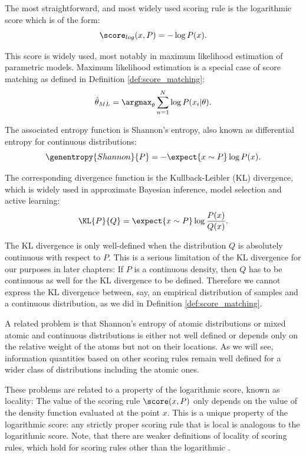 The most straightforward, and most widely used scoring rule is the logarithmic score which is of the form:
%
\begin{equation}
	\score_{log}(x,P) = - \log P(x).
\end{equation}

This score is widely used, most notably in maximum likelihood estimation of parametric models. Maximum likelihood estimation is a special case of score matching as defined in Definition \ref{def:score_matching}:
%
\begin{equation}
	\hat{\theta}_{ML} = \argmax_{\theta} \sum_{n=1}^{N} \log P(x_i \vert \theta).
\end{equation}

The associated entropy function is Shannon's entropy, also known as differential entropy for continuous distributions:
%
\begin{equation}
	\genentropy{Shannon}{P} = - \expect{x\sim P} \log P(x).
\end{equation}

The corresponding divergence function is the Kullback-Leibler (KL) divergence, which is widely used in approximate Bayesian inference, model selection and active learning:
%
\begin{equation}
	\KL{P}{Q} = \expect{x\sim P} \log \frac{P(x)}{Q(x)}.\label{eqn:KL_divergence}
\end{equation}

The KL divergence is only well-defined when the distribution $Q$ is absolutely continuous with respect to $P$. This is a serious limitation of the KL divergence for our purposes in later chapters: If $P$ is a continuous density, then $Q$ has to be continuous as well for the KL divergence to be defined. Therefore we cannot express the KL divergence between, say, an empirical distribution of samples and a continuous distribution, as we did in Definition \ref{def:score_matching}.

A related problem is that Shannon's entropy of atomic distributions or mixed atomic and continuous distributions is either not well defined or depends only on the relative weight of the atoms but not on their locations. As we will see, information quantities based on other scoring rules remain well defined for a wider class of distributions including the atomic ones.

These problems are related to a property of the logarithmic score, known as locality: The value of the scoring rule $\score(x,P)$ only depends on the value of the density function evaluated at the point $x$. This is a unique property of the logarithmic score: any strictly proper scoring rule that is local is analogous to the logarithmic score. Note, that there are weaker definitions of locality of scoring rules, which hold for scoring rules other than the logarithmic \citep{Parry2012, Dawid2012}.

